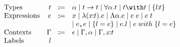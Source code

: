 \[ \begin{array}{lrrl}
  \text{Types} & t & \dcoloneq &
    \alpha
    \mid t \to t
    \mid \forall \alpha. t
    \mid t \with t
    \mid \recordtype{l}{t} \\

  \text{Expressions} & e & \dcoloneq &
    x
    \mid \abs{\rel{x}{t}}{e}
    \mid \Abs{\alpha}{e}
    \mid \app{e}{e}
    \mid \app{e}{t} \\ & & &
    \mid e \dcomma e
    \mid \recordintro{l}{e}
    \mid e.l
    \mid \recordupdate{e}{l}{e} \\

  \text{Contexts} & \Gamma & \dcoloneq &
    \epsilon
    \mid \Gamma, \alpha
    \mid \Gamma, \rel{x}{t} \\


  \text{Labels} & l &
\end{array} \]
